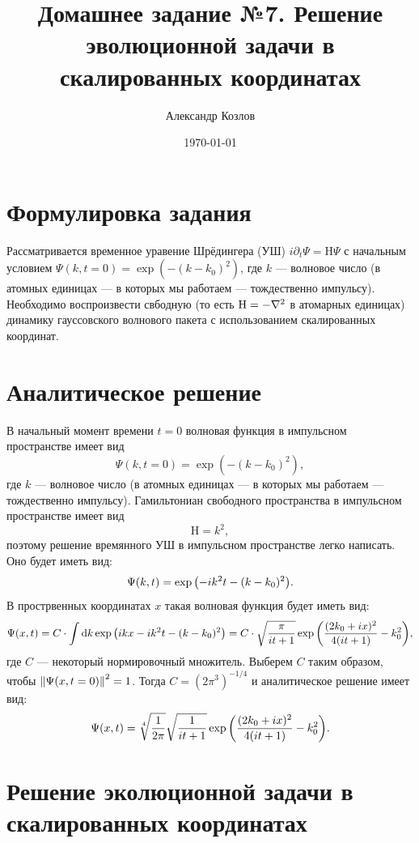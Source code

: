 \documentclass[10pt]{article}
\title{Домашнее задание №7. Решение эволюционной задачи в скалированных координатах}
\author{Александр Козлов}
\date{\today}
\begin{document}
\maketitle

\section*{Формулировка задания}

Рассматривается временное уравение Шрёдингера (УШ) $i\partial_t \Psi = \mathrm{H} \Psi$ с начальным условием $\Psi(k,t=0) = \exp(-(k-k_0)^2)$, где $k$ --- волновое число (в атомных единицах --- в которых мы работаем --- тождественно импульсу). Необходимо воспроизвести свбодную (то есть $\mathrm{H}=-\laplacian$ в атомарных единицах) динамику гауссовского волнового пакета с использованием скалированных координат.

\section{Аналитическое решение}

В начальный момент времени $t=0$ волновая функция в импульсном пространстве имеет вид $$\Psi(k,t=0) = \exp(-(k-k_0)^2),$$ где $k$ --- волновое число (в атомных единицах --- в которых мы работаем --- тождественно импульсу). Гамильтониан свободного пространства в импульсном пространстве имеет вид $$ \mathrm{H} = k^2,$$ поэтому решение времянного УШ в импульсном пространстве легко написать. Оно будет иметь вид:
\begin{equation}
 \Psi(k,t) =\exp\qty(-i k^2 t - (k-k_0)^2).
\end{equation}
В прострвенных координатах $x$ такая волновая функция будет иметь вид:
\begin{equation}
 \Psi(x,t) =  C \cdot \int \dd{k} \exp\qty(ikx -i k^2 t - (k-k_0)^2) = C \cdot \sqrt{\dfrac{\pi}{it+1}} \exp\qty(\dfrac{(2k_0 + ix)^2}{4(it+1)} - k_0^2),
\end{equation}
где $C$ --- некоторый нормировочный множитель. Выберем $C$ таким образом, чтобы $\norm{\Psi(x,t=0)}^2=1$. Тогда $C=(2\pi^3)^{-1/4}$ и аналитическое решение имеет вид:
\begin{equation}
 \Psi(x,t) = \sqrt[4]{\dfrac{1}{2\pi}} \sqrt{\dfrac{1}{it+1}} \exp\qty(\dfrac{(2k_0 + ix)^2}{4(it+1)} - k_0^2).
\end{equation}

\section{Решение эколюционной задачи в скалированных координатах}
\end{document}
